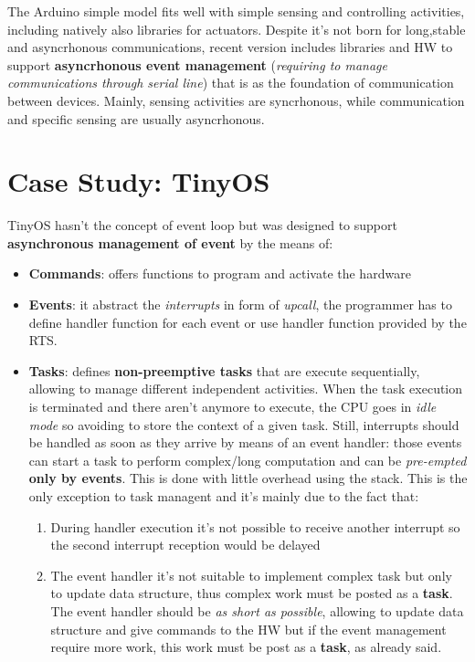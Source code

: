 \documentclass[10pt,a4paper]{report}
\theoremstyle{definition}
\begin{document}
The Arduino simple model fits well with simple sensing and controlling activities, including natively also libraries for actuators. Despite it's not born for long,stable and asyncrhonous communications, recent version includes libraries and HW to support \textbf{asyncrhonous event management} (\textit{requiring to manage communications through serial line}) that is as the foundation of communication between devices. Mainly, sensing activities are syncrhonous, while communication and specific sensing are usually asyncrhonous.
\section{Case Study: TinyOS}\label{sec:case-study-tinyos}
TinyOS hasn't the concept of event loop but was designed to support \textbf{asynchronous management of event} by the means of:
\begin{itemize}
	\item 
	\textbf{Commands}: offers functions to program and activate the hardware
	\item 
	\textbf{Events}: it abstract the \textit{interrupts} in form of \textit{upcall}, the programmer has to define handler function for each event or use handler function provided by the RTS.
	\item 
	\textbf{Tasks}: defines \textbf{non-preemptive tasks} that are execute sequentially, allowing to manage different independent activities.  When the task execution is terminated and there aren't anymore to execute, the CPU goes in \textit{idle mode} so avoiding to store the context of a given task.
	Still, interrupts should be handled as soon as they arrive by means of an event handler: those events can start a task to perform complex/long computation and can be \textit{pre-empted} \textbf{only by events}.  This is done with little overhead using the stack. This is the only exception to task managent and it's mainly due to the fact that:
	\begin{enumerate}
		\item 
		During handler execution it's not possible to receive another interrupt so the second interrupt reception would be delayed
		\item 
		The event handler it's not suitable to implement complex task but only to update data structure, thus complex work must be posted as a \textbf{task}.
		The event handler should be \textit{as short as possible}, allowing to update data structure and give commands to the HW but if the event management require more work, this work must be post as a \textbf{task}, as already said.
	\end{enumerate}
\end{itemize}
\end{document}
